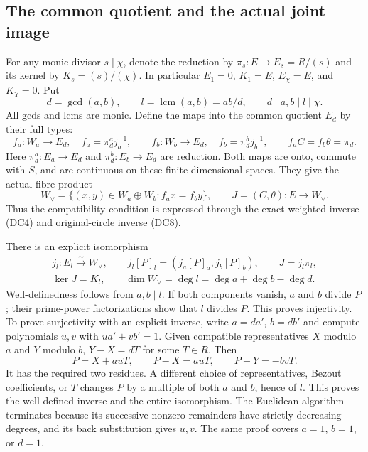 \documentclass{article}
\begin{document}
\subsection{The common quotient and the actual joint image}

For any monic divisor $s\mid\chi$, denote the reduction by
$\pi_s:E\to E_s=R/(s)$ and its kernel by $K_s=(s)/(\chi)$.
In particular $E_1=0$, $K_1=E$, $E_\chi=E$, and $K_\chi=0$.
Put
\[
 d=\gcd(a,b),\qquad l=\operatorname{lcm}(a,b)=ab/d,\qquad
 d\mid a,b\mid l\mid\chi .
 \tag{DC9}
\]
All gcds and lcms are monic.  Define the maps into the common quotient
$E_d$ by their full types:
\[
 f_a:W_a\to E_d,\quad f_a=\pi_d^a j_a^{-1},\qquad
 f_b:W_b\to E_d,\quad f_b=\pi_d^b j_b^{-1},
 \qquad f_a C=f_b\theta=\pi_d .
 \tag{DC10}
\]
Here $\pi_d^a:E_a\to E_d$ and $\pi_d^b:E_b\to E_d$ are reduction.
Both maps are onto, commute with $S$, and are continuous on these
finite-dimensional spaces.  They give the actual fibre product
\[
 W_\vee=
 \{(x,y)\in W_a\oplus W_b:f_a x=f_b y\},\qquad
 J=(C,\theta):E\to W_\vee .
 \tag{DC11}
\]
Thus the compatibility condition is expressed through the exact
weighted inverse (DC4) and original-circle inverse (DC8).

There is an explicit isomorphism
\[
 \begin{gathered}
 j_l:E_l\xrightarrow{\sim}W_\vee,\qquad
 j_l[P]_l=(j_a[P]_a,j_b[P]_b),\qquad J=j_l\pi_l,\\
 \ker J=K_l,\qquad
 \dim W_\vee=\deg l=\deg a+\deg b-\deg d .
 \end{gathered}
 \tag{DC12}
\]
Well-definedness follows from $a,b\mid l$.  If both components vanish,
$a$ and $b$ divide $P$; their prime-power factorizations show that $l$
divides $P$.  This proves injectivity.  To prove surjectivity with an
explicit inverse, write $a=da'$, $b=db'$ and compute polynomials
$u,v$ with $ua'+vb'=1$.  Given compatible representatives
$X$ modulo $a$ and $Y$ modulo $b$, $Y-X=dT$ for some $T\in R$.
Then
\[
 P=X+auT,\qquad
 P-X=auT,\qquad P-Y=-bvT.
 \tag{DC13}
\]
It has the required two residues.  A different choice of
representatives, Bezout coefficients, or $T$ changes $P$ by a
multiple of both $a$ and $b$, hence of $l$.  This proves the
well-defined inverse and the entire isomorphism.  The Euclidean
algorithm terminates because its successive nonzero remainders have
strictly decreasing degrees, and its back substitution gives $u,v$.
The same proof covers $a=1$, $b=1$, or $d=1$.
\end{document}
